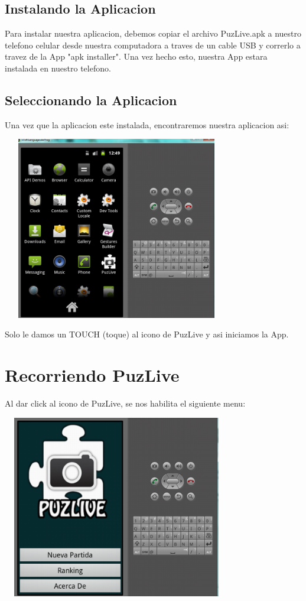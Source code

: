 \documentclass[10pt]{article}
\begin{document}
	\subsection{Instalando la Aplicacion}
		Para instalar nuestra aplicacion, debemos copiar el archivo PuzLive.apk a nuestro telefono celular desde nuestra computadora a traves de un cable USB 
		y correrlo a travez de la App "apk installer". Una vez hecho esto, nuestra App estara instalada en nuestro telefono.
	\subsection{Seleccionando la Aplicacion} 
		Una vez que la aplicacion este instalada, encontraremos nuestra aplicacion asi: \\
		\begin{center}
		\includegraphics[height=8cm,width=10cm]{outmenu.png}
		\end{center}	
		 Solo le damos un TOUCH (toque) al icono de PuzLive y asi iniciamos la App.	

\section{Recorriendo PuzLive}
	Al dar click al icono de PuzLive, se nos habilita el siguiente menu:
	\begin{center}
		\includegraphics[height=8cm,width=10cm]{menuPrin.png}
	\end{center}	
	
\end{document}
